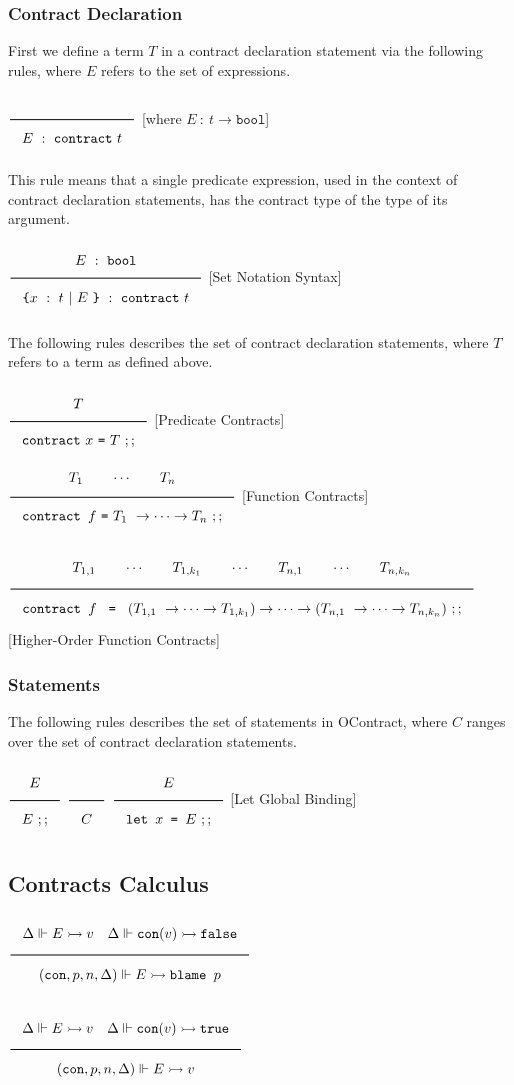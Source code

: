 \documentclass[a4paper]{article}
\newcommand{\Rule}[2]{\genfrac{}{}{0.7pt}{}{{\setlength{\fboxrule}{0pt}\setlength{\fboxsep}{3mm}\fbox{$#1$}}}{{\setlength{\fboxrule}{0pt}\setlength{\fboxsep}{3mm}\fbox{$#2$}}}}
\newcommand{\TruE}{\texttt{true}}
\newcommand{\FalsE}{\texttt{false}}
\newcommand{\Contract}{\texttt{contract}}
\newcommand{\Bool}{\texttt{bool}}
\newcommand{\eval}{\rightarrowtail}
\newcommand{\under}{\Vdash}
\newcommand{\Rb}{\texttt{\}}}
\newcommand{\Lb}{\texttt{\{}}
\newcommand{\blame}{\texttt{blame }}
\newcommand{\flatCon}{\texttt{con}}
\begin{document}
\subsubsection{Contract Declaration}

First we define a term $T$ in a contract declaration statement via the following rules, where $E$ refers to the set of expressions.

$\Rule{}{E\ :\ \Contract\ t}$ [where $E\ :\ t \rightarrow \Bool$]

This rule means that a single predicate expression, used in the context of contract declaration statements, has the contract type of the type of its argument.

$\Rule{E\ :\ \Bool}{\Lb x\ :\ t\ |\ E\ \Rb\ :\ \Contract\ t}$ [Set Notation Syntax]

The following rules describes the set of contract declaration statements, where $T$ refers to a term as defined above.

$\Rule{T}{\Contract\ x\ \texttt{=}\ T\ ;;}$ [Predicate Contracts]
\hfill
$\Rule{T_1 \qquad \cdots \qquad T_n}{\texttt{contract } f\ \texttt{=}\ T_1\ \rightarrow \cdots \rightarrow T_n\ ;;}$ [Function Contracts]

$\Rule{T_{1,1} \qquad \cdots \qquad T_{1,k_1} \qquad \cdots \qquad T_{n,1} \qquad \cdots \qquad T_{n,k_n}}
{\texttt{contract } f\ \texttt{ = }\ (T_{1,1}\ \rightarrow \cdots \rightarrow T_{1,k_1}) \rightarrow \cdots \rightarrow (T_{n,1}\ \rightarrow \cdots \rightarrow T_{n,k_n})\ ;;}$ [Higher-Order Function Contracts]

\subsubsection{Statements}

The following rules describes the set of statements in OContract, where $C$ ranges over the set of contract declaration statements.

$\Rule{E}{E\ ;;}$
\hfill
$\Rule{}{C}$
\hfill
$\Rule{E}{\texttt{let } x \texttt{ = } E\ ;;}$ [Let Global Binding]

\subsection{Contracts Calculus}

$\Rule{\Delta \under E \eval v \quad \Delta \under \flatCon(v) \eval \FalsE}
{(\flatCon, p, n, \Delta) \under E \eval \blame p}$

$\Rule{\Delta \under E \eval v \quad \Delta \under \flatCon(v) \eval \TruE}
{(\flatCon, p, n, \Delta) \under E \eval v}$
\end{document}
